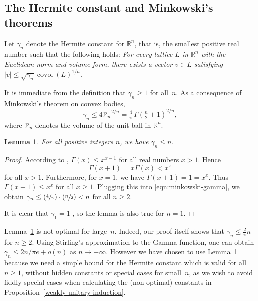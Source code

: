 \documentclass[JEP,XML,SOM,Unicode,NoFloatCountersInSection]{cedram}
\newcommand{\Psfrac}[2]{(\sfrac{#1}{#2})}
\newcommand{\bR}{\mathbb{R}}
\newcommand{\cV}{\mathcal{V}}
\DeclareMathOperator{\covol}{covol}
\newcommand{\abs}[1]{\lvert #1 \rvert}
\newtheorem{lemma}{Lemma}[section]
\begin{document}
\subsection{The Hermite constant and Minkowski's theorems}

Let $\gamma_n$ denote the Hermite constant for $\bR^n$, that is, the smallest positive real number such that the following holds:
\textit{For every lattice $L$ in $\bR^n$ with the Euclidean norm and volume form, there exists a vector $v \in L$ satisfying $\abs{v} \leq \sqrt{\gamma_n} \covol(L)^{1/n}$.}

It is immediate from the definition that $\gamma_n \geq 1$ for all~$n$.
As a consequence of Minkowski's theorem on convex bodies,
\begin{equation} \label{eqn:minkowski-gamma}
\gamma_n \leq 4 \cV_n^{-2/n} = \tfrac{4}{\pi}\, \Gamma(\tfrac{n}{2} + 1)^{2/n},
\end{equation}
where $\cV_n$ denotes the volume of the unit ball in $\bR^n$.

\begin{lemma} \label{hermite-constant-bound}
For all positive integers $n$, we have $\gamma_n \leq n$.
\end{lemma}

\begin{proof}
According to \cite[Th.\,1.5]{AQ97}, $\Gamma(x) \!\leq\! x^{x-1}$ for all real numbers $x\!>\!1$.
Hence
\[
\Gamma(x+1) = x\Gamma(x) < x^x
\]
for all $x > 1$.
Furthermore, for $x=1$, we have $\Gamma(x+1) = 1 = x^x$.
Thus $\Gamma(x+1) \leq x^x$ for all $x \geq 1$.
Plugging this into \eqref{eqn:minkowski-gamma}, we obtain $\gamma_n \leq \Psfrac{4}{\pi} \cdot \Psfrac{n}{2} < n$ for all $n \geq 2$.

It is clear that $\gamma_1=1$ \cite[App.]{cassels:geom-of-numbers}, so the lemma is also true for $n=1$.
\end{proof}

Lemma~\ref{hermite-constant-bound} is not optimal for large~$n$.
Indeed, our proof itself shows that $\gamma_n \leq \frac{2}{\pi}n$ for $n \geq 2$.
Using Stirling's approximation to the Gamma function, one can obtain $\gamma_n \leq 2n/\pi e + o(n)$ as $n \to +\infty$.
However we have chosen to use Lemma~\ref{hermite-constant-bound} because we need a simple bound for the Hermite constant which is valid for all $n \geq 1$, without hidden constants or special cases for small~$n$, as we wish to avoid fiddly special cases when calculating the (non-optimal) constants in Proposition~\ref{weakly-unitary-induction}.
\end{document}
